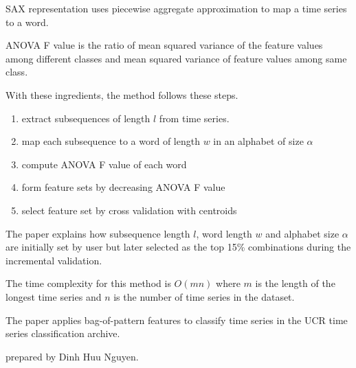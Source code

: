 \documentclass[12pt]{amsart}
\theoremstyle{definition}
\begin{document}
\dfn SAX representation uses piecewise aggregate approximation to map a time series to a word.

\dfn ANOVA F value is the ratio of mean squared variance of the feature values among different classes and mean squared variance of feature values among same class.

With these ingredients, the method follows these steps.
\begin{enumerate}[1.]
\item extract subsequences of length $l$ from time series.
\item map each subsequence to a word of length $w$ in an alphabet of size $\alpha$
\item compute ANOVA F value of each word
\item form feature sets by decreasing ANOVA F value
\item select feature set by cross validation with centroids
\end{enumerate}

The paper explains how subsequence length $l$, word length $w$ and alphabet size $\alpha$ are initially set by user but later selected as the top 15\% combinations during the incremental validation.

The time complexity for this method is $O(mn)$ where $m$ is the length of the longest time series and $n$ is the number of time series in the dataset.

The paper applies bag-of-pattern features to classify time series in the UCR time series classification archive.

\newpage
\begin{bibdiv}
\begin{biblist}
\end{biblist}
\end{bibdiv}

prepared by Dinh Huu Nguyen.
\end{document}
